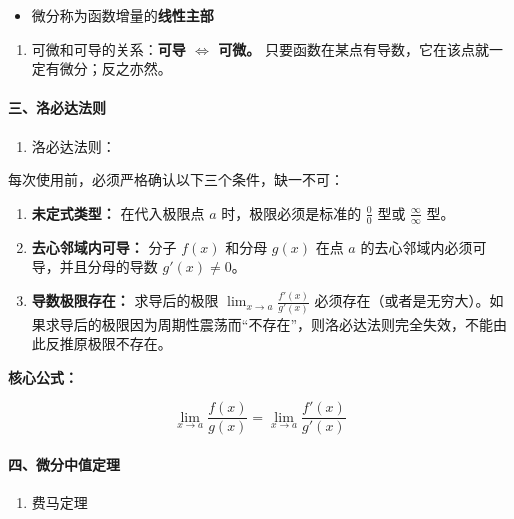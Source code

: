 \documentclass[
]{article}
\begin{document}
\begin{itemize}
\item
  微分称为函数增量的\textbf{线性主部}
\end{itemize}

\begin{enumerate}
\def\labelenumi{\arabic{enumi}.}
\item
  可微和可导的关系：\textbf{可导 \(\iff\) 可微。}
  只要函数在某点有导数，它在该点就一定有微分；反之亦然。
\end{enumerate}

\paragraph{三、洛必达法则}\label{ux4e09ux6d1bux5fc5ux8fbeux6cd5ux5219}

\begin{enumerate}
\def\labelenumi{\arabic{enumi}.}
\item
  洛必达法则：
\end{enumerate}

每次使用前，必须严格确认以下三个条件，缺一不可：

\begin{enumerate}
\def\labelenumi{\arabic{enumi}.}
\item
  \textbf{未定式类型：} 在代入极限点 \(a\) 时，极限必须是标准的
  \(\frac{0}{0}\) 型或 \(\frac{\infty}{\infty}\) 型。
\item
  \textbf{去心邻域内可导：} 分子 \(f(x)\) 和分母 \(g(x)\) 在点 \(a\)
  的去心邻域内必须可导，并且分母的导数 \(g'(x) \neq 0\)。
\item
  \textbf{导数极限存在：} 求导后的极限
  \(\lim_{x \to a} \frac{f'(x)}{g'(x)}\)
  必须存在（或者是无穷大）。如果求导后的极限因为周期性震荡而``不存在''，则洛必达法则完全失效，不能由此反推原极限不存在。
\end{enumerate}

\textbf{核心公式：}

\[\lim_{x \to a} \frac{f(x)}{g(x)} = \lim_{x \to a} \frac{f'(x)}{g'(x)}\]

\paragraph{四、微分中值定理}\label{ux56dbux5faeux5206ux4e2dux503cux5b9aux7406}

\begin{enumerate}
\def\labelenumi{\arabic{enumi}.}
\item
  费马定理
\end{enumerate}
\end{document}
